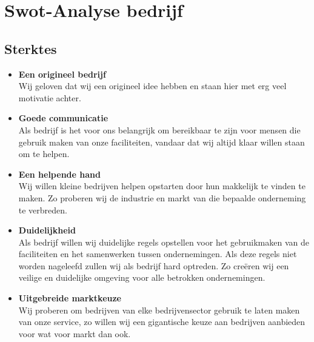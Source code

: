 \section{Swot-Analyse bedrijf}

\subsection{Sterktes}
\begin{itemize}
\item {\bf Een origineel bedrijf} \\
  Wij geloven dat wij een origineel idee hebben en staan hier met erg veel motivatie achter.
\item {\bf Goede communicatie} \\
  Als bedrijf is het voor ons belangrijk om bereikbaar te zijn voor mensen die gebruik maken van onze faciliteiten, vandaar dat wij altijd klaar willen staan om te helpen.
\item {\bf Een helpende hand} \\
  Wij willen kleine bedrijven helpen opstarten door hun makkelijk te vinden te maken. Zo proberen wij de industrie en markt van die bepaalde onderneming te verbreden.
\item {\bf Duidelijkheid} \\
  Als bedrijf willen wij duidelijke regels opstellen voor het gebruikmaken van de faciliteiten en het samenwerken tussen ondernemingen. Als deze regels niet worden nageleefd zullen wij als bedrijf hard optreden. Zo creëren wij een veilige en duidelijke omgeving voor alle betrokken ondernemingen.
\item {\bf Uitgebreide marktkeuze} \\
  Wij proberen om bedrijven van elke bedrijvensector gebruik te laten maken van onze service, zo willen wij een gigantische keuze aan bedrijven aanbieden voor wat voor markt dan ook.
\end{itemize}
